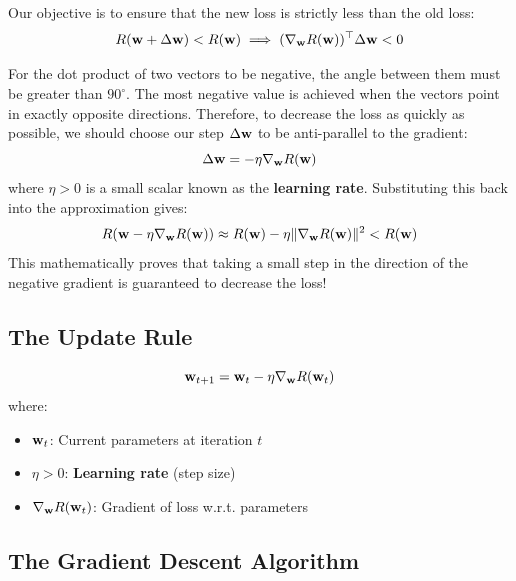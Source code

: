 Our objective is to ensure that the new loss is strictly less than the old loss:
\[
R(\mathbf{w} + \Delta \mathbf{w}) < R(\mathbf{w}) \implies (\nabla_{\mathbf{w}} R(\mathbf{w}))^\top \Delta \mathbf{w} < 0
\]

For the dot product of two vectors to be negative, the angle between them must be greater than $90^\circ$. The most negative value is achieved when the vectors point in exactly opposite directions. Therefore, to decrease the loss as quickly as possible, we should choose our step $\Delta \mathbf{w}$ to be anti-parallel to the gradient:
\[
\Delta \mathbf{w} = -\eta \nabla_{\mathbf{w}} R(\mathbf{w})
\]
where $\eta > 0$ is a small scalar known as the \textbf{learning rate}. Substituting this back into the approximation gives:
\[
R(\mathbf{w} - \eta \nabla_{\mathbf{w}} R(\mathbf{w})) \approx R(\mathbf{w}) - \eta \|\nabla_{\mathbf{w}} R(\mathbf{w})\|^2 < R(\mathbf{w})
\]
This mathematically proves that taking a small step in the direction of the negative gradient is guaranteed to decrease the loss!

\subsection{The Update Rule}

\begin{definitionbox}
\[
\mathbf{w}_{t+1} = \mathbf{w}_t - \eta \nabla_{\mathbf{w}} R(\mathbf{w}_t)
\]
where:
\begin{itemize}
    \item $\mathbf{w}_t$: Current parameters at iteration $t$
    \item $\eta > 0$: \textbf{Learning rate} (step size)
    \item $\nabla_{\mathbf{w}} R(\mathbf{w}_t)$: Gradient of loss w.r.t. parameters
\end{itemize}
\end{definitionbox}

\subsection{The Gradient Descent Algorithm}

